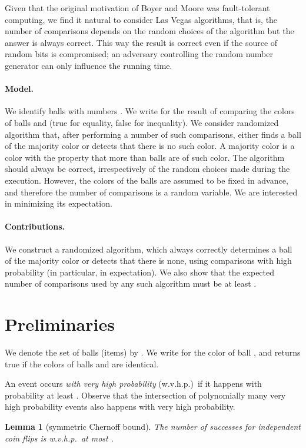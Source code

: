 \documentclass{article}[11pt,a4paper]
\newtheorem{lemma}[definition]{Lemma}
\begin{document}
Given that the original motivation of Boyer and Moore was fault-tolerant computing,
we find it natural to consider Las Vegas algorithms,
that is, the number of comparisons depends on the random choices of the algorithm
but the answer is always correct. This way the result is correct even if the source of random
bits is compromised; an adversary controlling the random number generator can only
influence the running time.

\paragraph{Model.} We identify balls with numbers . We write  for
the result of comparing the colors of balls  and  (true for equality, false for inequality). We consider randomized
algorithm that, after performing a number of such comparisons, either finds a ball
of the majority color or detects that there is no such color. A majority color is a color 
with the property that more than  balls are of such color. The algorithm
should always be correct, irrespectively of the random choices made during the execution.
However, the colors of the balls are assumed to be fixed in advance, and therefore
the number of comparisons is a random variable. We are interested in minimizing
its expectation.

\paragraph{Contributions.} We construct a randomized algorithm, which always correctly
determines a ball of the majority color or detects that there is none, using 
comparisons with high probability (in particular, in expectation). We also show that
the expected number of comparisons used by any such algorithm must be at least
.

\section{Preliminaries}

We denote the set of balls (items) by . We write  for the color of
ball , and  returns true if the colors of balls  and  are identical.

An event occurs \emph{with very high probability} (w.v.h.p.)\ if it happens with probability at least
. Observe that the intersection of polynomially many very high
probability events also happens with very high probability. 

\begin{lemma}[symmetric Chernoff bound]
The number of successes for  independent coin flips is w.v.h.p.\ at most  .
\end{lemma}
\end{document}
